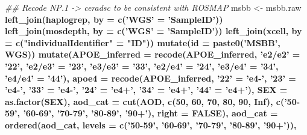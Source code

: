 \documentclass[]{book}
\newenvironment{Shaded}{\begin{snugshade}}{\end{snugshade}}
\newcommand{\CommentTok}[1]{\textcolor[rgb]{0.56,0.35,0.01}{\textit{#1}}}
\newcommand{\DataTypeTok}[1]{\textcolor[rgb]{0.13,0.29,0.53}{#1}}
\newcommand{\DecValTok}[1]{\textcolor[rgb]{0.00,0.00,0.81}{#1}}
\newcommand{\KeywordTok}[1]{\textcolor[rgb]{0.13,0.29,0.53}{\textbf{#1}}}
\newcommand{\NormalTok}[1]{#1}
\newcommand{\OperatorTok}[1]{\textcolor[rgb]{0.81,0.36,0.00}{\textbf{#1}}}
\newcommand{\OtherTok}[1]{\textcolor[rgb]{0.56,0.35,0.01}{#1}}
\newcommand{\StringTok}[1]{\textcolor[rgb]{0.31,0.60,0.02}{#1}}
\begin{document}
\begin{Shaded}
\begin{Highlighting}[]
{{{{{{{\CommentTok{## Recode NP.1 -> ceradsc to be consistent with ROSMAP}
\NormalTok{msbb <-}\StringTok{ }\NormalTok{msbb.raw }\OperatorTok{%>%}
\StringTok{  }\KeywordTok{left_join}\NormalTok{(haplogrep, }\DataTypeTok{by =} \KeywordTok{c}\NormalTok{(}\StringTok{'WGS'}\NormalTok{ =}\StringTok{ 'SampleID'}\NormalTok{)) }\OperatorTok{%>%}
\StringTok{  }\KeywordTok{left_join}\NormalTok{(mosdepth, }\DataTypeTok{by =} \KeywordTok{c}\NormalTok{(}\StringTok{'WGS'}\NormalTok{ =}\StringTok{ 'SampleID'}\NormalTok{)) }\OperatorTok{%>%}
\StringTok{  }\KeywordTok{left_join}\NormalTok{(xcell, }\DataTypeTok{by =} \KeywordTok{c}\NormalTok{(}\StringTok{"individualIdentifier"}\NormalTok{ =}\StringTok{ "ID"}\NormalTok{)) }\OperatorTok{%>%}
\StringTok{  }\KeywordTok{mutate}\NormalTok{(}\DataTypeTok{id =} \KeywordTok{paste0}\NormalTok{(}\StringTok{'MSBB'}\NormalTok{, WGS)) }\OperatorTok{%>%}
\StringTok{  }\KeywordTok{mutate}\NormalTok{(}\DataTypeTok{APOE_inferred =} \KeywordTok{recode}\NormalTok{(APOE_inferred, }\StringTok{'e2/e2'}\NormalTok{ =}\StringTok{ '22'}\NormalTok{, }\StringTok{'e2/e3'}\NormalTok{ =}\StringTok{ '23'}\NormalTok{, }\StringTok{'e3/e3'}\NormalTok{ =}\StringTok{ '33'}\NormalTok{, }\StringTok{'e2/e4'}\NormalTok{ =}\StringTok{ '24'}\NormalTok{, }\StringTok{'e3/e4'}\NormalTok{ =}\StringTok{ '34'}\NormalTok{, }\StringTok{'e4/e4'}\NormalTok{ =}\StringTok{ '44'}\NormalTok{),}
        \DataTypeTok{apoe4 =} \KeywordTok{recode}\NormalTok{(APOE_inferred, }\StringTok{'22'}\NormalTok{ =}\StringTok{ 'e4-'}\NormalTok{, }\StringTok{'23'}\NormalTok{ =}\StringTok{ 'e4-'}\NormalTok{, }\StringTok{'33'}\NormalTok{ =}\StringTok{ 'e4-'}\NormalTok{, }\StringTok{'24'}\NormalTok{ =}\StringTok{ 'e4+'}\NormalTok{, }\StringTok{'34'}\NormalTok{ =}\StringTok{ 'e4+'}\NormalTok{, }\StringTok{'44'}\NormalTok{ =}\StringTok{ 'e4+'}\NormalTok{),}
        \DataTypeTok{SEX =} \KeywordTok{as.factor}\NormalTok{(SEX),}
        \DataTypeTok{aod_cat =} \KeywordTok{cut}\NormalTok{(AOD, }\KeywordTok{c}\NormalTok{(}\DecValTok{50}\NormalTok{, }\DecValTok{60}\NormalTok{, }\DecValTok{70}\NormalTok{, }\DecValTok{80}\NormalTok{, }\DecValTok{90}\NormalTok{, }\OtherTok{Inf}\NormalTok{), }\KeywordTok{c}\NormalTok{(}\StringTok{'50-59'}\NormalTok{, }\StringTok{'60-69'}\NormalTok{, }\StringTok{'70-79'}\NormalTok{, }\StringTok{'80-89'}\NormalTok{, }\StringTok{'90+'}\NormalTok{), }\DataTypeTok{right =} \OtherTok{FALSE}\NormalTok{),}
        \DataTypeTok{aod_cat =} \KeywordTok{ordered}\NormalTok{(aod_cat, }\DataTypeTok{levels =} \KeywordTok{c}\NormalTok{(}\StringTok{'50-59'}\NormalTok{, }\StringTok{'60-69'}\NormalTok{, }\StringTok{'70-79'}\NormalTok{, }\StringTok{'80-89'}\NormalTok{, }\StringTok{'90+'}\NormalTok{)), }
}}}}}}}}}}}}
\end{Highlighting}
\end{Shaded}
\end{document}
